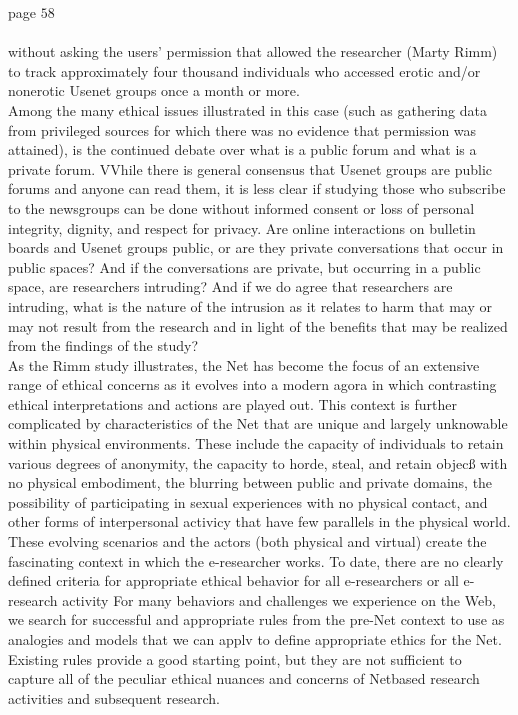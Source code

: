 \documentclass{book}
\begin{document}
page $58$\\\\
without asking the users' permission that allowed the researcher (Marty Rimm) to track approximately four thousand individuals who accessed erotic and/or nonerotic Usenet groups once a month or more.\\
Among the many ethical issues illustrated in this case (such as gathering data from privileged sources for which there was no evidence that permission was attained), is the continued debate over what is a public forum and what is a private forum. VVhile there is general consensus that Usenet groups are public forums and anyone can read them, it is less clear if studying those who subscribe to the newsgroups can be done without informed consent or loss of personal integrity, dignity, and respect for privacy. Are online interactions on bulletin boards and Usenet groups public, or are they private conversations that occur in public spaces? And if the conversations are private, but occurring in a public space, are researchers intruding? And if we do agree that researchers are intruding, what is the nature of the intrusion as it relates to harm that may or may not result from the research and in light of the benefits that may be realized from the findings of the study?\\
As the Rimm study illustrates, the Net has become the focus of an extensive range of ethical concerns as it evolves into a modern agora in which contrasting ethical interpretations and actions are played out. This context is further complicated by characteristics of the Net that are unique and largely unknowable within physical environments. These include the capacity of individuals to retain various degrees of anonymity, the capacity to horde, steal, and retain objecß with no physical embodiment, the blurring between public and private domains, the possibility of participating in sexual experiences with no physical contact, and other forms of interpersonal activicy that have few parallels in the physical world. These evolving scenarios and the actors (both physical and virtual) create the fascinating context in which the e-researcher works. To date, there are no clearly defined criteria for appropriate ethical behavior for all e-researchers or all e-research activity For many behaviors and challenges we experience on the Web, we search for successful and appropriate rules from the pre-Net context to use as analogies and models that we can applv to define appropriate ethics for the Net. Existing rules provide a good starting point, but they are not sufficient to capture all of the peculiar ethical nuances and concerns of Netbased research activities and subsequent research.\\
\end{document}
